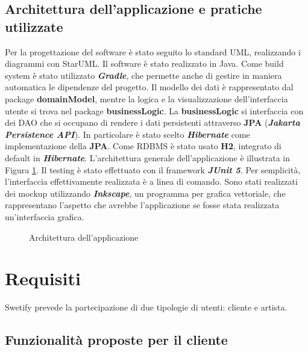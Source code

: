 \documentclass{article}
\begin{document}
  \subsection{Architettura dell'applicazione e pratiche utilizzate}
  Per la progettazione del software è stato seguito lo standard UML, realizzando i diagrammi con StarUML.
  Il software è stato realizzato in Java. Come build system è stato utilizzato \textbf{\textit{Gradle}}, che permette anche di gestire in maniera automatica le dipendenze del progetto. Il modello dei dati è rappresentato dal package \textbf{domainModel},
  mentre la logica e la visualizzazione dell'interfaccia utente si trova nel package \textbf{businessLogic}. La \textbf{businessLogic} si interfaccia con dei DAO che si occupano di rendere i dati persistenti attraverso \textbf{JPA} (\textbf{\textit{Jakarta Persistence API}}). In particolare è stato scelto \textbf{\textit{Hibernate}} come implementazione della \textbf{JPA}. Come RDBMS è stato usato \textbf{H2}, integrato di default in \textbf{\textit{Hibernate}}. L'architettura generale dell'applicazione è illustrata in Figura \ref{fig:architettura}.
  Il testing è stato effettuato con il framework \textbf{\textit{JUnit 5}}.
  Per semplicità, l'interfaccia effettivamente realizzata è a linea di comando.
  Sono stati realizzati dei mockup utilizzando \textbf{\textit{Inkscape}}, un programma per grafica vettoriale, che rappresentano l'aspetto che avrebbe l'applicazione se fosse stata realizzata un'interfaccia grafica.

  \begin{figure}[H]
    \centering
    
    \caption{Architettura dell'applicazione}
    \label{fig:architettura}
  \end{figure}


  \section{Requisiti}
  \label{sec:reqFunc}
  Swetify prevede la partecipazione di due tipologie di utenti: cliente e artista.

  \subsection{Funzionalità proposte per il cliente}
\end{document}
